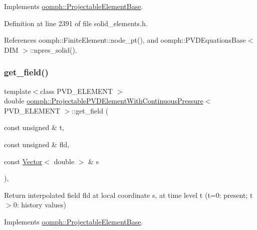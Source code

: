 Implements \hyperlink{classoomph_1_1ProjectableElementBase_a644306ebdf16f334344c2d27d72f18b7}{oomph\+::\+Projectable\+Element\+Base}.



Definition at line 2391 of file solid\+\_\+elements.\+h.



References oomph\+::\+Finite\+Element\+::node\+\_\+pt(), and oomph\+::\+P\+V\+D\+Equations\+Base$<$ D\+I\+M $>$\+::npres\+\_\+solid().

\mbox{\label{classoomph_1_1ProjectablePVDElementWithContinuousPressure_a541a3577c83ffd547e6504bebcbda836}} 
\subsubsection{\texorpdfstring{get\+\_\+field()}{get\_field()}}
{\footnotesize\ttfamily template$<$class P\+V\+D\+\_\+\+E\+L\+E\+M\+E\+NT $>$ \\
double \hyperlink{classoomph_1_1ProjectablePVDElementWithContinuousPressure}{oomph\+::\+Projectable\+P\+V\+D\+Element\+With\+Continuous\+Pressure}$<$ P\+V\+D\+\_\+\+E\+L\+E\+M\+E\+NT $>$\+::get\+\_\+field (\begin{DoxyParamCaption}\item[{const unsigned \&}]{t,  }\item[{const unsigned \&}]{fld,  }\item[{const \hyperlink{classoomph_1_1Vector}{Vector}$<$ double $>$ \&}]{s }\end{DoxyParamCaption})\hspace{0.3cm}{\ttfamily [inline]}, {\ttfamily [virtual]}}



Return interpolated field fld at local coordinate s, at time level t (t=0\+: present; t$>$0\+: history values) 



Implements \hyperlink{classoomph_1_1ProjectableElementBase_ae4da5b565b6d333be2f5920f7be763cd}{oomph\+::\+Projectable\+Element\+Base}.



